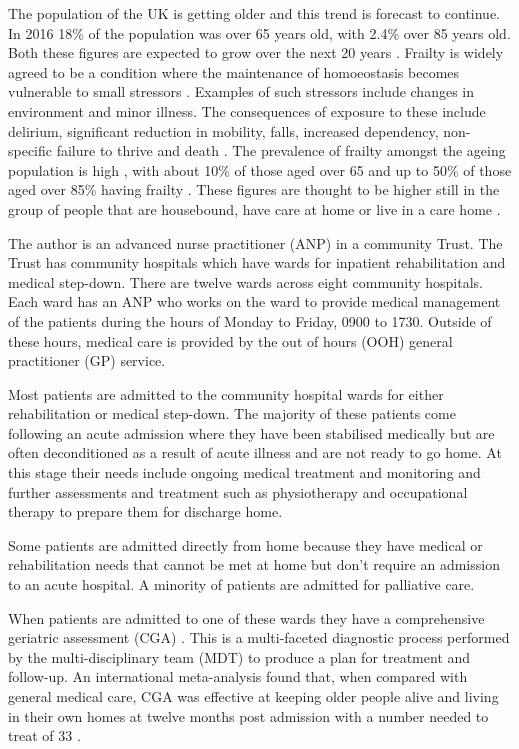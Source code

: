 \documentclass
[
	12pt,
	a4paper,
	oneside,
]{article}
\begin{document}
The population of the UK is getting older and this trend is forecast to continue.
In 2016 18\% of the population was over 65 years old, with 2.4\% over 85 years old.
Both these figures are expected to grow over the next 20 years \parencite{ons:17}.
Frailty is widely agreed to be a condition where the maintenance of homoeostasis 
becomes vulnerable to 
small stressors \parencite{vellas:16}.  Examples of such stressors include changes in environment and minor
illness. The consequences of exposure to these include delirium, significant reduction in mobility,
falls, increased dependency, non-specific failure to thrive and death 
\parencite{bgs:14,oliver:14,vellas:16}.
The prevalence of frailty amongst the ageing population is high \parencite{clegg:13},
with about 10\% of those aged over 65 and up to 50\% of
those aged over 85\% having frailty \parencite{bgs:14}. These figures
are thought to be higher still in the group of people that are housebound, 
have care at home or live in a care home \parencite{oliver:14}.

The author is an advanced nurse practitioner (ANP) in a community Trust.
The Trust has community hospitals which have wards for inpatient rehabilitation and
medical step-down. There are twelve wards across eight community hospitals. Each ward has
an ANP who works on the ward to provide medical management of the patients during 
the hours of Monday to Friday, 0900 to 1730. Outside of these hours, medical care 
is provided by the out of hours (OOH) general practitioner (GP) service. 

Most patients are admitted to the community hospital wards for either rehabilitation
or medical step-down. The majority of these patients come following an acute admission
where they have been stabilised medically but are often deconditioned as a result
of acute illness and are not ready to go home. At this stage their needs include 
ongoing medical treatment and monitoring and further assessments and treatment such 
as physiotherapy and occupational therapy to prepare them for discharge home.

Some patients are admitted directly from home because they have medical or rehabilitation
needs that cannot be met at home but don't require an admission to an acute hospital.
A minority of patients are admitted for palliative care.

When patients are admitted to one of these wards they have a comprehensive geriatric 
assessment (CGA) \parencite{bgs:14}. This is a multi-faceted diagnostic process
performed by the multi-disciplinary team (MDT) to produce a plan for treatment 
and follow-up.
An international meta-analysis found that, when compared with general medical care,
CGA was effective at keeping older people alive and living in their own homes at
twelve months post admission with a number needed to treat of 33 \parencite{ellis:11}.
\end{document}
